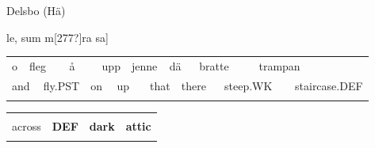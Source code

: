 \begin{listWWNumileveli}
\item {}

\begin{styleExample}
Delsbo (Hä)

\end{styleExample}

\end{listWWNumileveli}

\begin{styleExText}
[Marget o j$\Theta $ j[277?]le, sum m[277?]ra sa]

\end{styleExText}

\begin{tabular}{llllllllllllllll}
\lsptoprule
o & \multicolumn{2}{l}{fleg

} & \multicolumn{2}{l}{å

} & \multicolumn{2}{l}{upp

} & \multicolumn{2}{l}{jenne

} & \multicolumn{2}{l}{dä

} & \multicolumn{2}{l}{bratte

} & \multicolumn{2}{l}{trampan

} & \\
\multicolumn{2}{l}{and

} & \multicolumn{2}{l}{fly.PST

} & \multicolumn{2}{l}{on

} & \multicolumn{2}{l}{up

} & \multicolumn{2}{l}{that

} & \multicolumn{2}{l}{there

} & \multicolumn{2}{l}{steep.WK

} & \multicolumn{2}{l}{staircase.DEF

}\\
\lspbottomrule
\end{tabular}

\begin{tabular}{llll}
\lsptoprule
\multicolumn{4}{l}{evver

}\\
across & {\bfseries DEF} & {\bfseries dark} & {\bfseries attic}\\
\lspbottomrule
\end{tabular}

